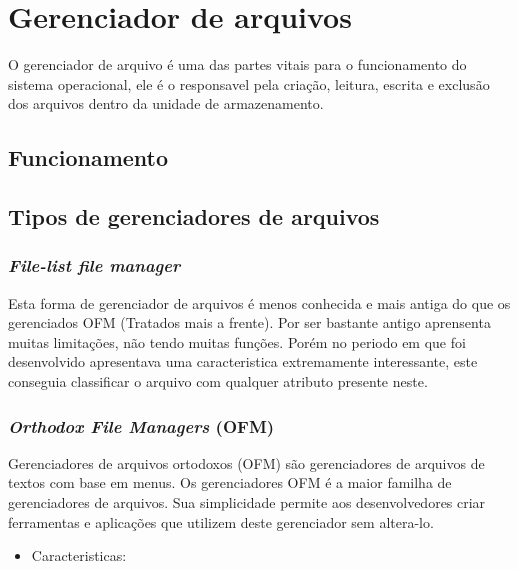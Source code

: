 \documentclass{article}
\begin{document}
\section{Gerenciador de arquivos}

O gerenciador de arquivo é uma das partes vitais para o funcionamento do sistema operacional, ele é o responsavel pela criação, leitura, escrita e exclusão dos arquivos dentro da unidade de armazenamento.

\subsection{Funcionamento}


\subsection{Tipos de gerenciadores de arquivos}


\subsubsection{\textit{File-list file manager}}

Esta forma de gerenciador de arquivos é menos conhecida e mais antiga do que os gerenciados OFM  (Tratados mais a frente). Por ser bastante antigo aprensenta muitas limitações, não tendo muitas funções. Porém no periodo em que foi desenvolvido apresentava uma caracteristica extremamente interessante, este conseguia classificar o arquivo com qualquer atributo presente neste.

\subsubsection{\textit{Orthodox File Managers} (OFM)}


Gerenciadores de arquivos ortodoxos (OFM) são gerenciadores de arquivos de textos com base em menus. Os gerenciadores OFM é a maior familha de gerenciadores de arquivos. Sua simplicidade permite aos desenvolvedores criar ferramentas e aplicações que utilizem deste gerenciador sem altera-lo.


\begin{itemize}

	\item Caracteristicas: \\



\end{itemize}
\end{document}
